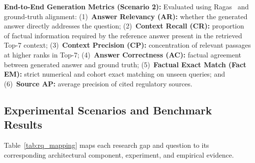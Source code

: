 \textbf{End-to-End Generation Metrics (Scenario 2):} Evaluated using Ragas~\cite{es2023ragas} and ground-truth alignment: (1)~\textbf{Answer Relevancy (AR):} whether the generated answer directly addresses the question; (2)~\textbf{Context Recall (CR):} proportion of factual information required by the reference answer present in the retrieved Top-7 context; (3)~\textbf{Context Precision (CP):} concentration of relevant passages at higher ranks in Top-7; (4)~\textbf{Answer Correctness (AC):} factual agreement between generated answer and ground truth; (5)~\textbf{Factual Exact Match (Fact EM):} strict numerical and cohort exact matching on unseen queries; and (6)~\textbf{Source AP:} average precision of cited regulatory sources.

\subsection{Experimental Scenarios and Benchmark Results}
\label{sec:scenarios}

Table~\ref{tab:rq_mapping} maps each research gap and question to its corresponding architectural component, experiment, and empirical evidence.

\begin{table}[!htbp]
\centering
\caption{Systematic mapping between Research Gaps, RQs, Proposed Modules, and Target Metrics.}
\label{tab:rq_mapping}
\end{table}

